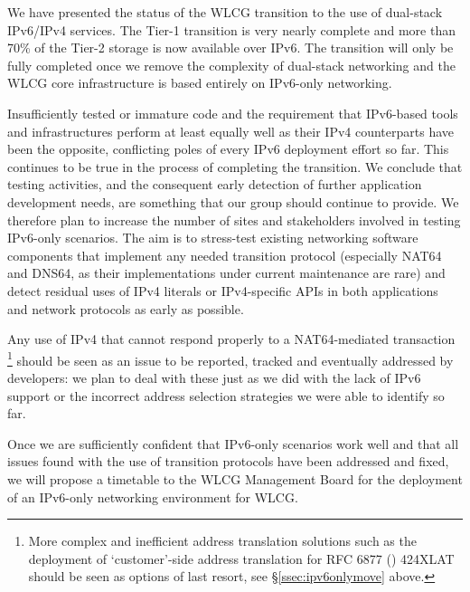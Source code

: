 
We have presented the status of the WLCG transition to the use of dual-stack IPv6/IPv4 services. The Tier-1 transition is very nearly complete and 
more than 70\% of the Tier-2 storage is now available over IPv6. The transition will only be fully completed once we remove the complexity of
dual-stack networking and the WLCG core infrastructure is based entirely on IPv6-only networking.


Insufficiently tested or immature code and the requirement that IPv6-based
tools and infrastructures perform at least equally well as their IPv4
counterparts have been the opposite, conflicting poles of every IPv6
deployment effort so far. This continues to be true in the process
of completing the transition. We conclude that
testing activities, and the consequent early detection of further application
development needs, are something that our group should continue to provide. We therefore plan
to increase the number of sites and stakeholders involved in testing IPv6-only 
scenarios. The aim is to stress-test existing networking software components
that implement any needed transition protocol (especially NAT64 and DNS64, as 
their implementations under current maintenance are rare) and detect
residual uses of IPv4 literals or IPv4-specific APIs in both applications and
network protocols as early as possible.\par
Any use of IPv4 that cannot respond properly to a NAT64-mediated
transaction
\footnote{More complex and inefficient address
translation solutions such as the deployment of `customer'-side address
translation for RFC 6877 (\cite{rfc}) 424XLAT should be
seen as options of last resort, see \S \ref{ssec:ipv6onlymove} above.}
should be seen as an issue to be reported, tracked and eventually
addressed by developers: we plan to deal with these just as we did
with the lack of IPv6 support or the incorrect address selection
strategies we were able to identify so far.\par
Once we are sufficiently confident that IPv6-only scenarios work well and that
all issues found with the use of transition protocols have been addressed and fixed, we will
propose a timetable to the WLCG Management Board for the deployment of an IPv6-only networking 
environment for WLCG.
